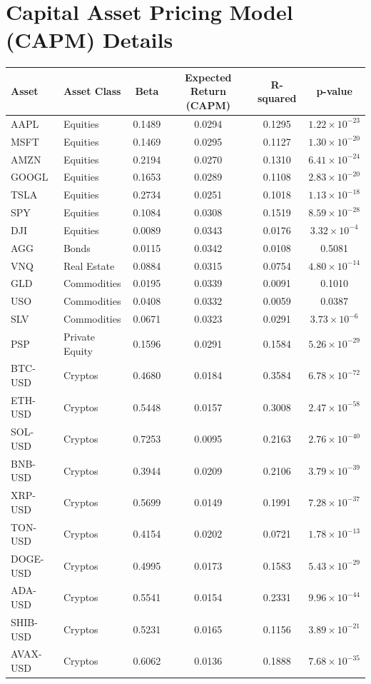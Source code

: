 \newpage
\appendix
\setcounter{section}{0}
\section{Capital Asset Pricing Model (CAPM) Details}\label{appendix:capm_details}

\begin{longtable}{|l|l|c|c|c|c|}
\hline
\textbf{Asset} & \textbf{Asset Class} & \textbf{Beta} & \textbf{Expected Return (CAPM)} & \textbf{R-squared} & \textbf{p-value} \\
\hline
AAPL & Equities & 0.1489 & 0.0294 & 0.1295 & $1.22 \times 10^{-23}$ \\
MSFT & Equities & 0.1469 & 0.0295 & 0.1127 & $1.30 \times 10^{-20}$ \\
AMZN & Equities & 0.2194 & 0.0270 & 0.1310 & $6.41 \times 10^{-24}$ \\
GOOGL & Equities & 0.1653 & 0.0289 & 0.1108 & $2.83 \times 10^{-20}$ \\
TSLA & Equities & 0.2734 & 0.0251 & 0.1018 & $1.13 \times 10^{-18}$ \\
SPY & Equities & 0.1084 & 0.0308 & 0.1519 & $8.59 \times 10^{-28}$ \\
DJI & Equities & 0.0089 & 0.0343 & 0.0176 & $3.32 \times 10^{-4}$ \\
AGG & Bonds & 0.0115 & 0.0342 & 0.0108 & 0.5081 \\
VNQ & Real Estate & 0.0884 & 0.0315 & 0.0754 & $4.80 \times 10^{-14}$ \\
GLD & Commodities & 0.0195 & 0.0339 & 0.0091 & 0.1010 \\
USO & Commodities & 0.0408 & 0.0332 & 0.0059 & 0.0387 \\
SLV & Commodities & 0.0671 & 0.0323 & 0.0291 & $3.73 \times 10^{-6}$ \\
PSP & Private Equity & 0.1596 & 0.0291 & 0.1584 & $5.26 \times 10^{-29}$ \\
BTC-USD & Cryptos & 0.4680 & 0.0184 & 0.3584 & $6.78 \times 10^{-72}$ \\
ETH-USD & Cryptos & 0.5448 & 0.0157 & 0.3008 & $2.47 \times 10^{-58}$ \\
SOL-USD & Cryptos & 0.7253 & 0.0095 & 0.2163 & $2.76 \times 10^{-40}$ \\
BNB-USD & Cryptos & 0.3944 & 0.0209 & 0.2106 & $3.79 \times 10^{-39}$ \\
XRP-USD & Cryptos & 0.5699 & 0.0149 & 0.1991 & $7.28 \times 10^{-37}$ \\
TON-USD & Cryptos & 0.4154 & 0.0202 & 0.0721 & $1.78 \times 10^{-13}$ \\
DOGE-USD & Cryptos & 0.4995 & 0.0173 & 0.1583 & $5.43 \times 10^{-29}$ \\
ADA-USD & Cryptos & 0.5541 & 0.0154 & 0.2331 & $9.96 \times 10^{-44}$ \\
SHIB-USD & Cryptos & 0.5231 & 0.0165 & 0.1156 & $3.89 \times 10^{-21}$ \\
AVAX-USD & Cryptos & 0.6062 & 0.0136 & 0.1888 & $7.68 \times 10^{-35}$ \\
\hline
\end{longtable}

